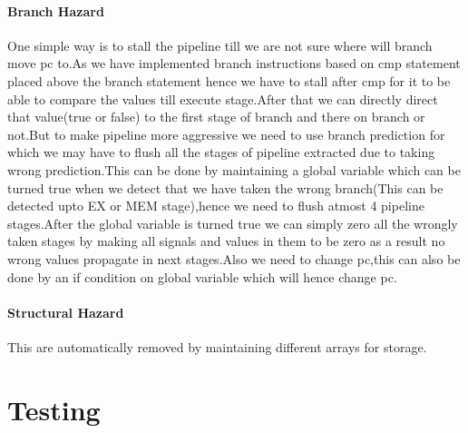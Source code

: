 \documentclass[12pt]{extarticle}
\begin{document}
\paragraph{Branch Hazard}
 One simple way is to stall the pipeline till we are not sure where will branch move pc to.As we have implemented branch instructions based on cmp statement placed above the branch statement hence we have to stall after cmp for it to be able to compare the values till execute stage.After that we can directly direct that value(true or false) to the first stage of branch and there on branch or not.But to make pipeline more aggressive we need to use branch prediction for which we may have to flush all the stages of pipeline extracted due to taking wrong prediction.This can be done by maintaining a global variable which can be turned true when we detect that we have taken the wrong branch(This can be detected upto EX or MEM stage),hence we need to flush atmost 4 pipeline stages.After the global variable is turned true we can simply zero all the wrongly taken stages by making all signals and values in them to be zero as a result no wrong values propagate in next stages.Also we need to change pc,this can also be done by an if condition on global variable which will hence change pc.
     
\paragraph{Structural Hazard}
This are automatically removed by maintaining different arrays for storage.
\section{Testing}
\end{document}

